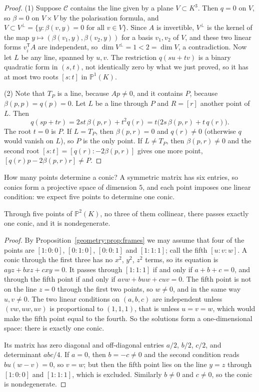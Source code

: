 \begin{proof}
(1) Suppose $\mathcal C$ contains the line given by a plane $V\subset K^3$. Then $q=0$ on $V$, so $\beta=0$ on $V\times V$ by the polarisation
formula, and $V\subset V^\perp=\{y:\beta(v,y)=0\text{ for all }v\in V\}$. Since $A$ is invertible, $V^\perp$ is the kernel of the map
$y\mapsto(\beta(v_1,y),\beta(v_2,y))$ for a basis $v_1,v_2$ of $V$, and these two linear forms $v_i^{\mathsf T}A$ are independent, so
$\dim V^\perp=1<2=\dim V$, a contradiction. Now let $L$ be any line, spanned by $u,v$. The restriction $q(su+tv)$ is a binary quadratic form in
$(s,t)$, not identically zero by what we just proved, so it has at most two roots $[s:t]$ in $\mathbb P^1(K)$.

(2) Note that $T_P$ is a line, because $Ap\ne0$, and it contains $P$, because $\beta(p,p)=q(p)=0$. Let $L$ be a line through $P$ and $R=[r]$ another
point of $L$. Then
\[
q(sp+tr)=2st\,\beta(p,r)+t^2q(r)=t\bigl(2s\,\beta(p,r)+t\,q(r)\bigr).
\]
The root $t=0$ is $P$. If $L=T_P$, then $\beta(p,r)=0$ and $q(r)\ne0$ (otherwise $q$ would vanish on $L$), so $P$ is the only point. If $L\ne T_P$,
then $\beta(p,r)\ne0$ and the second root $[s:t]=[q(r):-2\beta(p,r)]$ gives one more point, $[q(r)p-2\beta(p,r)r]\ne P$.
\end{proof}

How many points determine a conic? A symmetric matrix has six entries, so conics form a projective space of dimension $5$, and each point imposes one
linear condition: we expect five points to determine one conic.

\begin{theorem}\label{geometry:thm:fivepoints}
Through five points of $\mathbb P^2(K)$, no three of them collinear, there passes exactly one conic, and it is nondegenerate.
\end{theorem}

\begin{proof}
By Proposition~\ref{geometry:prop:frames} we may assume that four of the points are $[1:0:0]$, $[0:1:0]$, $[0:0:1]$ and $[1:1:1]$; call the fifth $[u:v:w]$. A
conic through the first three has no $x^2$, $y^2$, $z^2$ terms, so its equation is $ayz+bxz+cxy=0$. It passes through $[1:1:1]$ if and only if
$a+b+c=0$, and through the fifth point if and only if $avw+buw+cuv=0$. The fifth point is not on the line $z=0$ through the first two points, so
$w\ne0$, and in the same way $u,v\ne0$. The two linear conditions on $(a,b,c)$ are independent unless $(vw,uw,uv)$ is proportional to $(1,1,1)$, that
is unless $u=v=w$, which would make the fifth point equal to the fourth. So the solutions form a one-dimensional space: there is exactly one conic.

Its matrix has zero diagonal and off-diagonal entries $a/2$, $b/2$, $c/2$, and determinant $abc/4$. If $a=0$, then $b=-c\ne0$ and the second condition
reads $bu(w-v)=0$, so $v=w$; but then the fifth point lies on the line $y=z$ through $[1:0:0]$ and $[1:1:1]$, which is excluded. Similarly $b\ne0$
and $c\ne0$, so the conic is nondegenerate.
\end{proof}

